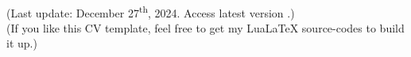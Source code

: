 \documentclass[localFont]{awesome-source-cv} %
\begin{document}
	\makecvheader

	
	
	

	\noindent \\		
	(Last update: December 27\textsuperscript{th}, 2024. Access latest version .)\\
	(If you like this CV template, feel free to get  \hspace{0.35 mm} my LuaLaTeX source-codes to build it up.)
\end{document}

